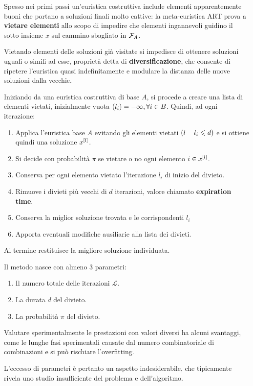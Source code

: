 \documentclass[\main/main.tex]{subfiles}
\begin{document}
\begin{definition}
    Spesso nei primi passi un’euristica costruttiva include elementi apparentemente buoni che portano a soluzioni finali molto cattive: la meta-euristica ART prova a \textbf{vietare elementi} allo scopo di impedire che elementi ingannevoli guidino il sotto-insieme \(x\) sul cammino sbagliato in \(\mathcal{F}_A\).
    
    Vietando elementi delle soluzioni già visitate si impedisce di ottenere soluzioni uguali o simili ad esse, proprietà detta di \textbf{diversificazione}, che consente di ripetere l'euristica quasi indefinitamente e modulare la distanza delle nuove soluzioni dalla vecchie.
    
    Iniziando da una euristica costruttiva di base \(A\), si procede a creare una lista di elementi vietati, inizialmente vuota \(\left(l_i\right) = -\infty, \forall i \in B\). Quindi, ad ogni iterazione:
    \begin{enumerate}
        \item Applica l'euristica base \(A\) evitando gli elementi vietati \(\left(l - l_i \leqslant d\right)\) e si ottiene quindi una soluzione \(x^{\left[l\right]}\).
        \item Si decide con probabilità \(\pi\) se vietare o no ogni elemento \(i \in x^{\left[l\right]}\).
        \item Conserva per ogni elemento vietato l'iterazione \(l_i\) di inizio del divieto.
        \item Rimuove i divieti più vecchi di \(d\) iterazioni, valore chiamato \textbf{expiration time}.
        \item Conserva la miglior soluzione trovata e le corrispondenti \(l_i\)
        \item Apporta eventuali modifiche ausiliarie alla lista dei divieti.
    \end{enumerate}
    
    Al termine restituisce la migliore soluzione individuata.
\end{definition}
\begin{observation}
    Il metodo nasce con almeno \(3\) parametri:
    
    \begin{enumerate}
        \item Il numero totale delle iterazioni \(\mathcal{L}\).
        \item La durata \(d\) del divieto.
        \item La probabilità \(\pi\) del divieto.
    \end{enumerate}
    
    Valutare sperimentalmente le prestazioni con valori diversi ha alcuni svantaggi, come le lunghe fasi sperimentali causate dal numero combinatoriale di combinazioni e si può rischiare l'overfitting.
    
    L'eccesso di parametri è pertanto un aspetto indesiderabile, che tipicamente rivela uno studio insufficiente del problema e dell'algoritmo.
\end{observation}
\end{document}
